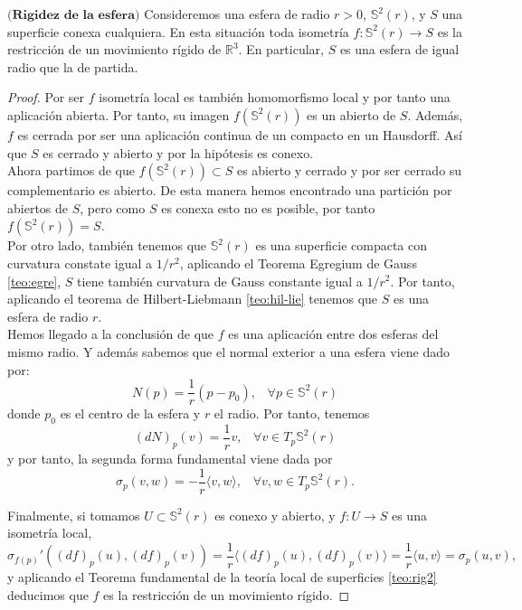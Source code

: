\begin{teorema}
	$\textbf{(Rigidez de la esfera)}$ Consideremos una esfera de radio $r>0$, $\mathbb{S}^2(r)$, y $S$ una superficie conexa cualquiera. En esta situación toda isometría $f : \mathbb{S}^2(r) \to S$ es la restricción de un movimiento rígido de $\mathbb{R}^3$. En particular, $S$ es una esfera de igual radio que la de partida.
\end{teorema}

\begin{proof}
	Por ser $f$ isometría local es también homomorfismo local y por tanto una aplicación abierta. Por tanto, su imagen $f(\mathbb{S}^2(r))$ es un abierto de $S$. Además, $f$ es cerrada por ser una aplicación continua de un compacto en un Hausdorff. Así que $S$ es cerrado y abierto y por la hipótesis es conexo.
		${ }$\\
		
	Ahora partimos de que $f(\mathbb{S}^2(r)) \subset S$ es abierto y cerrado y por ser cerrado su complementario es abierto. De esta manera hemos encontrado una partición por abiertos de $S$, pero como $S$ es conexa esto no es posible, por tanto $f(\mathbb{S}^2(r)) = S$.
		${ }$\\
		
	Por otro lado, también tenemos que $\mathbb{S}^2(r)$ es una superficie compacta con curvatura constate igual a $1 / r^2$, aplicando el Teorema Egregium de Gauss \ref{teo:egre}, $S$ tiene también curvatura de Gauss constante igual a $1 / r^2$. Por tanto, aplicando el teorema de Hilbert-Liebmann \ref{teo:hil-lie} tenemos que $S$ es una esfera de radio $r$.
		${ }$\\
		
	Hemos llegado a la conclusión de que $f$ es una aplicación entre dos esferas del mismo radio. Y además sabemos que el normal exterior a una esfera viene dado por:
	\[
		N(p) = \frac{1}{r} (p - p_0),  \;\;\;  \forall p \in \mathbb{S}^2(r)
	\]
	donde $p_0$ es el centro de la esfera y $r$ el radio. Por tanto, tenemos
	\[
		(dN)_p (v) = \frac{1}{r} v,  \;\;\;  \forall v \in T_p \mathbb{S}^2(r)
	\]
	y por tanto, la segunda forma fundamental viene dada por
	\[
		\sigma_p (v, w) = - \frac{1}{r} \langle v, w \rangle,  \;\;\;  \forall v, w \in T_p \mathbb{S}^2(r).
	\]
	
	Finalmente, si tomamos $U \subset \mathbb{S}^2(r)$ es conexo y abierto, y $f: U \to  S$ es una isometría local,
	\[
		\sigma_{f(p)}'((df)_p(u), (df)_p(v)) = \frac{1}{r} \langle (df)_p(u), (df)_p(v) \rangle = \frac{1}{r} \langle u, v \rangle = \sigma_p (u,v),
	\]
	y aplicando el Teorema fundamental de la teoría local de superficies \ref{teo:rig2} deducimos que $f$ es la restricción de un movimiento rígido.
	
	
	
	
\end{proof}
	${ }$\\

